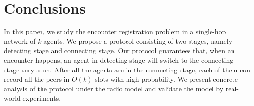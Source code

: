 \section{Conclusions}
\label{sectionconclusion}
\vspace{-0.01in}
In this paper, we study the encounter registration problem in a single-hop network of $k$ 
agents. We propose a protocol consisting of two stages, namely detecting stage and 
connecting stage. Our protocol guarantees that, when an encounter happens, 
an agent in detecting stage will switch 
to the connecting stage very soon. After all the agents are in the connecting stage,  
each of them can record all the peers in $O(k)$ slots with high probability.
We present concrete analysis of the protocol under the radio model and validate the model 
by real-world experiments. 